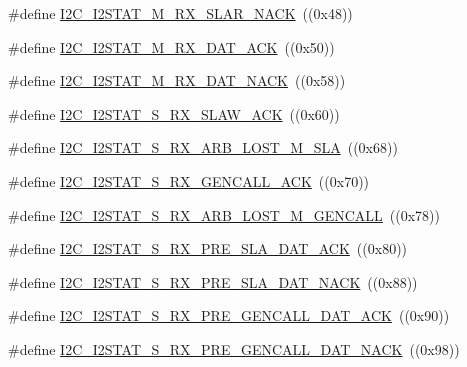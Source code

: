 \begin{DoxyCompactItemize}
\#define \hyperlink{group__I2C__17XX__40XX_gafe156febe3313a9f3423776f97d0f24f}{I2\-C\-\_\-\-I2\-S\-T\-A\-T\-\_\-\-M\-\_\-\-R\-X\-\_\-\-S\-L\-A\-R\-\_\-\-N\-A\-C\-K}~((0x48))
\item 
\#define \hyperlink{group__I2C__17XX__40XX_ga2f07d3cfad351ba3c976d629db20cea2}{I2\-C\-\_\-\-I2\-S\-T\-A\-T\-\_\-\-M\-\_\-\-R\-X\-\_\-\-D\-A\-T\-\_\-\-A\-C\-K}~((0x50))
\item 
\#define \hyperlink{group__I2C__17XX__40XX_ga9cc5203175775bfa5ae6df5d6d98b014}{I2\-C\-\_\-\-I2\-S\-T\-A\-T\-\_\-\-M\-\_\-\-R\-X\-\_\-\-D\-A\-T\-\_\-\-N\-A\-C\-K}~((0x58))
\item 
\#define \hyperlink{group__I2C__17XX__40XX_ga7055c4b55feda352df8016cbca0c270b}{I2\-C\-\_\-\-I2\-S\-T\-A\-T\-\_\-\-S\-\_\-\-R\-X\-\_\-\-S\-L\-A\-W\-\_\-\-A\-C\-K}~((0x60))
\item 
\#define \hyperlink{group__I2C__17XX__40XX_gaf13df6ed7d10be0e063bcbc04d329749}{I2\-C\-\_\-\-I2\-S\-T\-A\-T\-\_\-\-S\-\_\-\-R\-X\-\_\-\-A\-R\-B\-\_\-\-L\-O\-S\-T\-\_\-\-M\-\_\-\-S\-L\-A}~((0x68))
\item 
\#define \hyperlink{group__I2C__17XX__40XX_gadcab34e87ad115c011e23a5bd4fb8aa3}{I2\-C\-\_\-\-I2\-S\-T\-A\-T\-\_\-\-S\-\_\-\-R\-X\-\_\-\-G\-E\-N\-C\-A\-L\-L\-\_\-\-A\-C\-K}~((0x70))
\item 
\#define \hyperlink{group__I2C__17XX__40XX_ga1605c253472e071e7f77e51bda156ba7}{I2\-C\-\_\-\-I2\-S\-T\-A\-T\-\_\-\-S\-\_\-\-R\-X\-\_\-\-A\-R\-B\-\_\-\-L\-O\-S\-T\-\_\-\-M\-\_\-\-G\-E\-N\-C\-A\-L\-L}~((0x78))
\item 
\#define \hyperlink{group__I2C__17XX__40XX_ga4342227592c3e2e345517bd3e6cd8089}{I2\-C\-\_\-\-I2\-S\-T\-A\-T\-\_\-\-S\-\_\-\-R\-X\-\_\-\-P\-R\-E\-\_\-\-S\-L\-A\-\_\-\-D\-A\-T\-\_\-\-A\-C\-K}~((0x80))
\item 
\#define \hyperlink{group__I2C__17XX__40XX_gace56a90d55426cc6ab2a4ca540c63d02}{I2\-C\-\_\-\-I2\-S\-T\-A\-T\-\_\-\-S\-\_\-\-R\-X\-\_\-\-P\-R\-E\-\_\-\-S\-L\-A\-\_\-\-D\-A\-T\-\_\-\-N\-A\-C\-K}~((0x88))
\item 
\#define \hyperlink{group__I2C__17XX__40XX_ga75dd46ddb054c4d47a531b8e90f7f446}{I2\-C\-\_\-\-I2\-S\-T\-A\-T\-\_\-\-S\-\_\-\-R\-X\-\_\-\-P\-R\-E\-\_\-\-G\-E\-N\-C\-A\-L\-L\-\_\-\-D\-A\-T\-\_\-\-A\-C\-K}~((0x90))
\item 
\#define \hyperlink{group__I2C__17XX__40XX_ga20c65f8a82c18211127e5c335026bd76}{I2\-C\-\_\-\-I2\-S\-T\-A\-T\-\_\-\-S\-\_\-\-R\-X\-\_\-\-P\-R\-E\-\_\-\-G\-E\-N\-C\-A\-L\-L\-\_\-\-D\-A\-T\-\_\-\-N\-A\-C\-K}~((0x98))
\item 

\end{DoxyCompactItemize}
